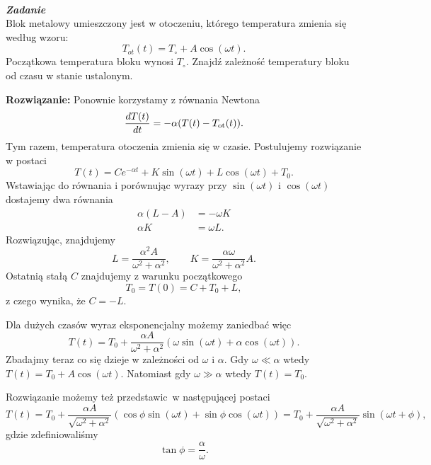 \documentclass[11pt,a4paper]{article}
\newcounter{zadanie}\newcommand{\zadanie}[1][]{\addtocounter{zadanie}{1} ~\\  {\bf \emph{Zadanie \arabic{zadanie} #1 }} \\}
\begin{document}
\zadanie
Blok metalowy umieszczony jest w otoczeniu, którego temperatura
zmienia się według wzoru:
\[T_{ot}(t) = T_\circ + A \cos(\omega t).\]
Początkowa temperatura bloku wynosi $T_\circ$. Znajdź zależność
temperatury bloku od czasu w stanie ustalonym.
\vskip 10pt

\textbf{Rozwiązanie:}
Ponownie korzystamy z równania Newtona
\begin{equation}
	\frac{dT(t)}{dt} = -\alpha (T(t) - T_{\rm ot}(t)).
\end{equation}
Tym razem, temperatura otoczenia zmienia się w czasie. Postulujemy rozwiązanie w postaci
\begin{equation}
	T(t) = C e^{-\alpha t} + K \sin (\omega t) + L \cos (\omega t) + T_0.
\end{equation}
Wstawiając do równania i porównując wyrazy przy $\sin(\omega t)$ i $\cos(\omega t)$ dostajemy dwa równania
\begin{align}
	\alpha (L-A)  &= -\omega K \\
	\alpha K &=  \omega L.
\end{align}
Rozwiązując, znajdujemy
\begin{equation}
	L = \frac{\alpha^2 A}{\omega^2 + \alpha^2}, \qquad K =  \frac{\alpha \omega}{\omega^2 + \alpha^2} A.
\end{equation}
Ostatnią stałą $C$ znajdujemy z warunku początkowego
\begin{equation}
	T_0 = T(0) = C + T_0 + L,
\end{equation}
z czego wynika, że $C = - L$. 

Dla dużych czasów wyraz eksponencjalny możemy zaniedbać więc
\begin{equation}
	T(t) = T_0 + \frac{\alpha A}{\omega^2 + \alpha^2} \left(\omega \sin(\omega t) + \alpha \cos(\omega t)\right).
\end{equation}
Zbadajmy teraz co się dzieje w zależności od $\omega$ i $\alpha$. Gdy $\omega \ll \alpha$ wtedy $T(t) = T_0 + A \cos(\omega t)$. Natomiast gdy $\omega \gg \alpha$ wtedy $T(t) = T_0$.

Rozwiązanie możemy też przedstawic w następującej postaci
\begin{equation}
	T(t) = T_0 + \frac{\alpha A}{\sqrt{\omega^2 + \alpha^2}} \left(\cos \phi \sin(\omega t) + \sin \phi \cos(\omega t)\right) = T_0 + \frac{\alpha A}{\sqrt{\omega^2 + \alpha^2}}\sin(\omega t + \phi),
\end{equation}
gdzie zdefiniowaliśmy
\begin{equation}
	\tan \phi = \frac{\alpha}{\omega}.
\end{equation}
\end{document}
